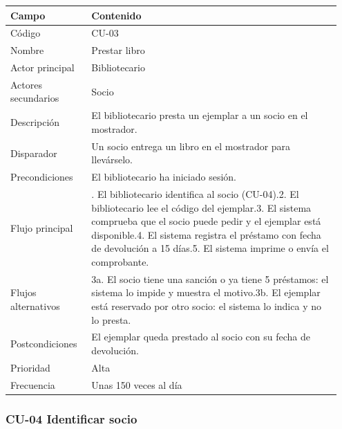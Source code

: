 {\small
\begin{longtable}{@{}>{\raggedright\arraybackslash}p{0.232\linewidth}>{\raggedright\arraybackslash}p{0.717\linewidth}@{}}
\toprule
\textbf{Campo} & \textbf{Contenido} \\
\midrule
\endhead
Código & CU-03 \\
Nombre & Prestar libro \\
Actor principal & Bibliotecario \\
Actores secundarios & Socio \\
Descripción & El bibliotecario presta un ejemplar a un socio en el mostrador. \\
Disparador & Un socio entrega un libro en el mostrador para llevárselo. \\
Precondiciones & El bibliotecario ha iniciado sesión. \\
Flujo principal & 1. El bibliotecario identifica al socio (CU-04).\newline{}2. El bibliotecario lee el código del ejemplar.\newline{}3. El sistema comprueba que el socio puede pedir y el ejemplar está disponible.\newline{}4. El sistema registra el préstamo con fecha de devolución a 15 días.\newline{}5. El sistema imprime o envía el comprobante. \\
Flujos alternativos & 3a. El socio tiene una sanción o ya tiene 5 préstamos: el sistema lo impide y muestra el motivo.\newline{}3b. El ejemplar está reservado por otro socio: el sistema lo indica y no lo presta. \\
Postcondiciones & El ejemplar queda prestado al socio con su fecha de devolución. \\
Prioridad & Alta \\
Frecuencia & Unas 150 veces al día \\
\bottomrule
\end{longtable}}

\subsubsection*{CU-04 Identificar socio}

